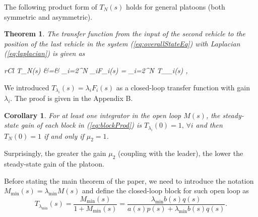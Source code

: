 \documentclass[technote, 10pt, twoside]{IEEEtran}
\newcommand{\weightGain}{\mu}
\newcommand{\contNumCoef}{q}
\newcommand{\contDenCoef}{p}
\newcommand{\vehNumCoef}{b}
\newcommand{\vehDenCoef}{a}
\newcommand{\lapDom}{s}
\newcommand{\openLoop}{M}
\newcommand{\openLoopGain}{\openLoop_{\min}}
\newcommand{\wn}{i}
\newcommand{\numVeh}{N}
\newcommand{\spatEig}{\lambda} \newcommand{\spatEigWn}{\lambda_\wn}
\newcommand{\spatEigMin}{\spatEig_{\min}}
\newcommand{\diagTransBlock}{{F}}
\newcommand{\diagTransBlockWn}{\diagTransBlock_{\wn}}
\newcommand{\diagTransBlockEig}{T}
\newcommand{\diagTransBlockEigWn}{\diagTransBlockEig_{\spatEigWn}}
\newcommand{\diagTransBlockEigMin}{\diagTransBlockEig_{\spatEig_{\min}}}
\newcommand{\diagTransBlockN}{\diagTransBlockEig_{\numVeh}}
\theoremstyle{plain}
\newtheorem{theorem}{Theorem}
\newtheorem{corollary}{Corollary}
\theoremstyle{definition}
\theoremstyle{assump}
\begin{document}
The following product form of $\diagTransBlockN(s)$ holds for general platoons
(both symmetric and asymmetric).
\begin{theorem} The transfer function from the input of the second vehicle to the
	position of the last vehicle in the system (\ref{eq:overallStateEq}) with
	Laplacian (\ref{eq:laplacian}) is given as
	\begin{IEEEeqnarray}{rCl}
		\diagTransBlockN(\lapDom) &=& \frac{1}{\weightGain_2} \prod_{\wn=2}^{\numVeh}
		\spatEigWn \diagTransBlockWn(\lapDom) =\frac{1}{\weightGain_2} \prod_{\wn=2}^{\numVeh}
		\diagTransBlockEigWn(\lapDom) 
,
		\label{eq:blockProd}
	\end{IEEEeqnarray}
	\label{lem:blockProd} 
\end{theorem} 
\vspace{-15pt}

We introduced
$\diagTransBlockEigWn(\lapDom)=\spatEigWn\diagTransBlockWn(\lapDom)$ as a
closed-loop transfer function with gain $\spatEig_i$. The proof is given in the
Appendix B.
\begin{corollary} 
	For at least one integrator in the open loop $\openLoop(s)$,
	the steady-state gain of each block in (\ref{eq:blockProd})
	is $\diagTransBlockEigWn(0)=1, \, \forall i$ and then $\diagTransBlockN(0)=1$
	if and only if $\weightGain_2=1$.
\end{corollary}
Surprisingly, the greater the gain $\weightGain_2$ (coupling with the
leader), the lower the steady-state gain of the platoon.
 
Before stating the main theorem of the paper, we need to introduce the notation
$\openLoopGain(s)=\spatEigMin \openLoop(s)$  and define the closed-loop block
for such open loop as
\begin{equation}
	\diagTransBlockEigMin(s)=
	\frac{\openLoopGain(s)}{1+\openLoopGain(s)}=\frac{\spatEigMin
	\vehNumCoef(s)\contNumCoef(s)}{\vehDenCoef(s)\contDenCoef(s) + \spatEigMin \vehNumCoef(s)\contNumCoef(s)}. \label{eq:diagBlockEigMin}
\end{equation}
\end{document}
